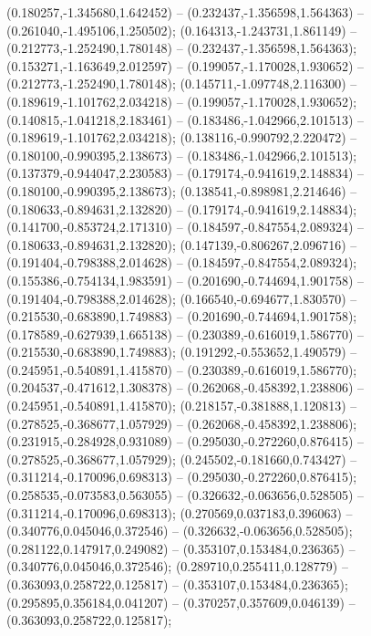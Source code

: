  (0.180257,-1.345680,1.642452) -- (0.232437,-1.356598,1.564363) -- (0.261040,-1.495106,1.250502);
 (0.164313,-1.243731,1.861149) -- (0.212773,-1.252490,1.780148) -- (0.232437,-1.356598,1.564363);
 (0.153271,-1.163649,2.012597) -- (0.199057,-1.170028,1.930652) -- (0.212773,-1.252490,1.780148);
 (0.145711,-1.097748,2.116300) -- (0.189619,-1.101762,2.034218) -- (0.199057,-1.170028,1.930652);
 (0.140815,-1.041218,2.183461) -- (0.183486,-1.042966,2.101513) -- (0.189619,-1.101762,2.034218);
 (0.138116,-0.990792,2.220472) -- (0.180100,-0.990395,2.138673) -- (0.183486,-1.042966,2.101513);
 (0.137379,-0.944047,2.230583) -- (0.179174,-0.941619,2.148834) -- (0.180100,-0.990395,2.138673);
 (0.138541,-0.898981,2.214646) -- (0.180633,-0.894631,2.132820) -- (0.179174,-0.941619,2.148834);
 (0.141700,-0.853724,2.171310) -- (0.184597,-0.847554,2.089324) -- (0.180633,-0.894631,2.132820);
 (0.147139,-0.806267,2.096716) -- (0.191404,-0.798388,2.014628) -- (0.184597,-0.847554,2.089324);
 (0.155386,-0.754134,1.983591) -- (0.201690,-0.744694,1.901758) -- (0.191404,-0.798388,2.014628);
 (0.166540,-0.694677,1.830570) -- (0.215530,-0.683890,1.749883) -- (0.201690,-0.744694,1.901758);
 (0.178589,-0.627939,1.665138) -- (0.230389,-0.616019,1.586770) -- (0.215530,-0.683890,1.749883);
 (0.191292,-0.553652,1.490579) -- (0.245951,-0.540891,1.415870) -- (0.230389,-0.616019,1.586770);
 (0.204537,-0.471612,1.308378) -- (0.262068,-0.458392,1.238806) -- (0.245951,-0.540891,1.415870);
 (0.218157,-0.381888,1.120813) -- (0.278525,-0.368677,1.057929) -- (0.262068,-0.458392,1.238806);
 (0.231915,-0.284928,0.931089) -- (0.295030,-0.272260,0.876415) -- (0.278525,-0.368677,1.057929);
 (0.245502,-0.181660,0.743427) -- (0.311214,-0.170096,0.698313) -- (0.295030,-0.272260,0.876415);
 (0.258535,-0.073583,0.563055) -- (0.326632,-0.063656,0.528505) -- (0.311214,-0.170096,0.698313);
 (0.270569,0.037183,0.396063) -- (0.340776,0.045046,0.372546) -- (0.326632,-0.063656,0.528505);
 (0.281122,0.147917,0.249082) -- (0.353107,0.153484,0.236365) -- (0.340776,0.045046,0.372546);
 (0.289710,0.255411,0.128779) -- (0.363093,0.258722,0.125817) -- (0.353107,0.153484,0.236365);
 (0.295895,0.356184,0.041207) -- (0.370257,0.357609,0.046139) -- (0.363093,0.258722,0.125817);

